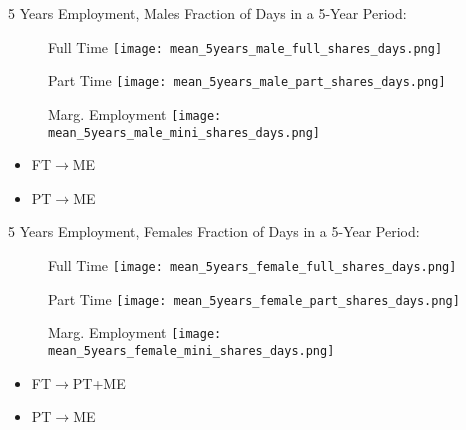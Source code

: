 \documentclass[hyperref={bookmarks=false}]{beamer}
\begin{document}
\begin{appendix}
\begin{frame}{5 Years Employment, Males}
Fraction of Days in a 5-Year Period:
\begin{figure}[!t]
\begin{minipage}[b]{0.32\textwidth}{Full Time}
\centering
\texttt{[image: mean\_5years\_male\_full\_shares\_days.png]}
\end{minipage}
\begin{minipage}[b]{0.32\textwidth}{Part Time}
\centering
\texttt{[image: mean\_5years\_male\_part\_shares\_days.png]}
\end{minipage}
\begin{minipage}[b]{0.32\textwidth}{Marg. Employment}
\centering
\texttt{[image: mean\_5years\_male\_mini\_shares\_days.png]}
\end{minipage}
\end{figure}
\begin{itemize}
\item FT$\rightarrow$ME
\item PT$\rightarrow$ME
\end{itemize}
\end{frame}

\begin{frame}{5 Years Employment, Females}
Fraction of Days in a 5-Year Period:
\begin{figure}[!t]
\begin{minipage}[b]{0.32\textwidth}{Full Time}
\centering
\texttt{[image: mean\_5years\_female\_full\_shares\_days.png]}
\end{minipage}
\begin{minipage}[b]{0.32\textwidth}{Part Time}
\centering
\texttt{[image: mean\_5years\_female\_part\_shares\_days.png]}
\end{minipage}
\begin{minipage}[b]{0.32\textwidth}{Marg. Employment}
\centering
\texttt{[image: mean\_5years\_female\_mini\_shares\_days.png]}
\end{minipage}
\end{figure}
\begin{itemize}
\item FT$\rightarrow$PT+ME
\item PT$\rightarrow$ME
\end{itemize}
\hyperlink{DATA}{}
\end{frame}


\end{appendix}
\end{document}

